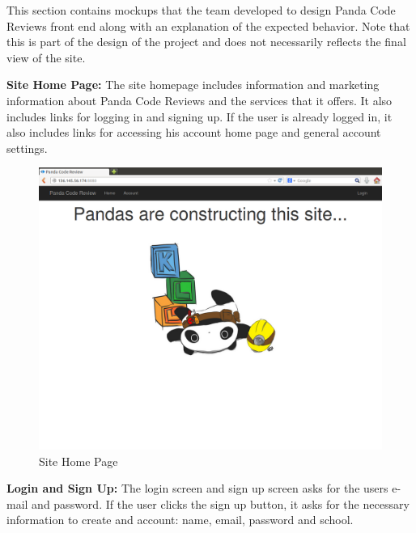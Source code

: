 \label{sec:mockups}

This section contains mockups that the team developed to design Panda Code Reviews front end along with an explanation of the expected behavior. Note that this is part of the design of the project and does not necessarily reflects the final view of the site.

\textbf{Site Home Page:} The site homepage includes information and
marketing information about Panda Code Reviews and the services that it offers.
It also includes links for logging in and signing up. If the user is already
logged in, it also includes links for accessing his account home page and
general account settings.

\begin{figure}[H]
	\centering
	\includegraphics[width=\textwidth]{img/index}
	\caption{Site Home Page}
\end{figure}

\textbf{Login and Sign Up:} The login screen and sign up screen asks for
the users e-mail and password. If the user clicks the sign up button, it asks
for the necessary information to create and account: name,
email, password and school.


